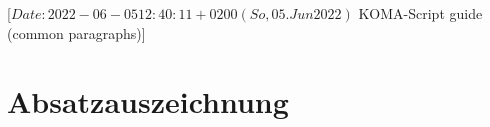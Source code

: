 %
%
%
%
%
%
%

                 [$Date: 2022-06-05 12:40:11 +0200 (So, 05. Jun 2022) $
                  KOMA-Script guide (common paragraphs)]

\section{Absatzauszeichnung}
%
\BeginIndexGroup
{}%

